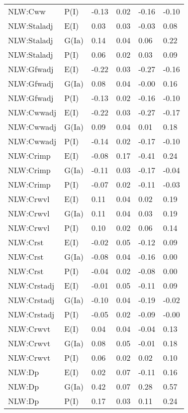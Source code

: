 \begin{center}
\begin{longtable}{|p{1.1in}|p{0.7in}|p{0.7in}|p{0.6in}|p{0.6in}|p{0.6in}|}
  NLW:Cww & P(I) & -0.13 & 0.02 & -0.16 & -0.10 \\ 
  NLW:Staladj & E(I) & 0.03 & 0.03 & -0.03 & 0.08 \\ 
  NLW:Staladj & G(Ia) & 0.14 & 0.04 & 0.06 & 0.22 \\ 
  NLW:Staladj & P(I) & 0.06 & 0.02 & 0.03 & 0.09 \\ 
  NLW:Gfwadj & E(I) & -0.22 & 0.03 & -0.27 & -0.16 \\ 
  NLW:Gfwadj & G(Ia) & 0.08 & 0.04 & -0.00 & 0.16 \\ 
  NLW:Gfwadj & P(I) & -0.13 & 0.02 & -0.16 & -0.10 \\ 
  NLW:Cwwadj & E(I) & -0.22 & 0.03 & -0.27 & -0.17 \\ 
  NLW:Cwwadj & G(Ia) & 0.09 & 0.04 & 0.01 & 0.18 \\ 
  NLW:Cwwadj & P(I) & -0.14 & 0.02 & -0.17 & -0.10 \\ 
  NLW:Crimp & E(I) & -0.08 & 0.17 & -0.41 & 0.24 \\ 
  NLW:Crimp & G(Ia) & -0.11 & 0.03 & -0.17 & -0.04 \\ 
  NLW:Crimp & P(I) & -0.07 & 0.02 & -0.11 & -0.03 \\ 
  NLW:Crwvl & E(I) & 0.11 & 0.04 & 0.02 & 0.19 \\ 
  NLW:Crwvl & G(Ia) & 0.11 & 0.04 & 0.03 & 0.19 \\ 
  NLW:Crwvl & P(I) & 0.10 & 0.02 & 0.06 & 0.14 \\ 
  NLW:Crst & E(I) & -0.02 & 0.05 & -0.12 & 0.09 \\ 
  NLW:Crst & G(Ia) & -0.08 & 0.04 & -0.16 & 0.00 \\ 
  NLW:Crst & P(I) & -0.04 & 0.02 & -0.08 & 0.00 \\ 
  NLW:Crstadj & E(I) & -0.01 & 0.05 & -0.11 & 0.09 \\ 
  NLW:Crstadj & G(Ia) & -0.10 & 0.04 & -0.19 & -0.02 \\ 
  NLW:Crstadj & P(I) & -0.05 & 0.02 & -0.09 & -0.00 \\ 
  NLW:Crwvt & E(I) & 0.04 & 0.04 & -0.04 & 0.13 \\ 
  NLW:Crwvt & G(Ia) & 0.08 & 0.05 & -0.01 & 0.18 \\ 
  NLW:Crwvt & P(I) & 0.06 & 0.02 & 0.02 & 0.10 \\ 
  NLW:Dp & E(I) & 0.02 & 0.07 & -0.11 & 0.16 \\ 
  NLW:Dp & G(Ia) & 0.42 & 0.07 & 0.28 & 0.57 \\ 
  NLW:Dp & P(I) & 0.17 & 0.03 & 0.11 & 0.24 \\ 

\end{longtable}
\end{center}

